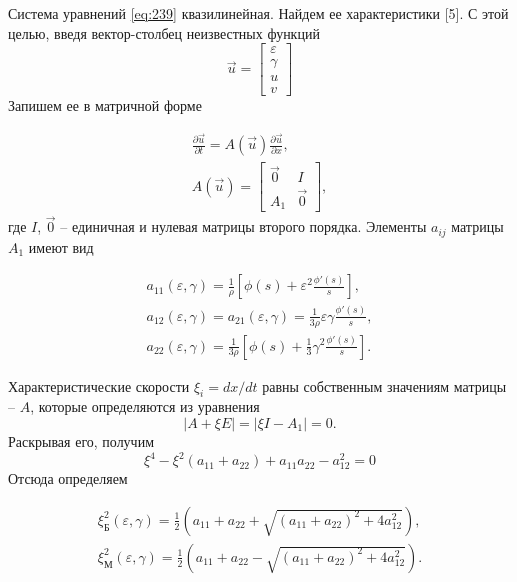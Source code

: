 \documentclass[specialist, subf, href, colorlinks=true, 14pt, final]{disser}
\theoremstyle{definition}
\begin{document}
Система уравнений \eqref{eq:239} квазилинейная. Найдем ее характеристики [5]. С этой целью, введя вектор-столбец неизвестных функций
\[
	\overrightarrow{u} = \left[
		\begin{array}{l}
		\varepsilon\\ \gamma \\ u \\ v
		\end{array}
	    \right]
\]
Запишем ее в матричной форме
\addtocounter{equation}{1}
\begin{equation}\label{eq:2310}
		\begin{array}{l}
			\displaystyle \frac{\partial \overrightarrow{u}}{\partial t} = A(\overrightarrow{u})\displaystyle \frac{\partial \overrightarrow{u}}{\partial x},  \\
			A(\overrightarrow{u}) = \left[
			\begin{array}{cc}
				\overrightarrow{0} & I \\ A_1 & \overrightarrow{0}
			\end{array}
			\right],
		\end{array}
  	\tag{10}
\end{equation} 
где $I$, $\overrightarrow{0}$ -- единичная и нулевая матрицы второго порядка. Элементы $a_{ij}$ матрицы $A_1$ имеют вид
\addtocounter{equation}{1}
\begin{equation}\label{eq:2311}
		\begin{array}{l}
			a_{11}(\varepsilon, \gamma) = \displaystyle \frac{1}{\rho}\left[ \phi(s) + \varepsilon^2 \displaystyle \frac{\phi'(s)}{s} \right] , \\
			a_{12}(\varepsilon, \gamma) = a_{21}(\varepsilon, \gamma) = \displaystyle \frac{1}{3 \rho} \varepsilon \gamma \displaystyle \frac{\phi'(s)}{s} ,\\
			a_{22}(\varepsilon, \gamma) = \displaystyle \frac{1}{3 \rho}\left[ \phi(s) + \displaystyle \frac{1}{3}\gamma^2 \displaystyle \frac{\phi'(s)}{s} \right].
		\end{array}
  	\tag{11}
\end{equation}

Характеристические скорости $\xi_{i} = dx/dt$ равны собственным значениям матрицы -- $A$, которые определяются из уравнения
\[ |A + \xi E| = |\xi I - A_1| = 0.\]
Раскрывая его, получим 
\[ \xi^4 -\xi^2(a_{11} + a_{22}) + a_{11}a_{22} - a_{12}^2 = 0 \]
Отсюда определяем
\addtocounter{equation}{1}
\begin{equation}\label{eq:2312}
		\begin{array}{l}
			\xi^2_{\text{Б}}(\varepsilon, \gamma) = \frac{1}{2} ( a_{11} + a_{22} + \sqrt{(a_{11} + a_{22})^2 + 4 a_{12}^2 } ), \\
			\xi^2_{\text{М}}(\varepsilon, \gamma) = \frac{1}{2} ( a_{11} + a_{22} - \sqrt{(a_{11} + a_{22})^2 + 4 a_{12}^2 } ).
		\end{array}
  	\tag{12}
\end{equation}
\end{document}
